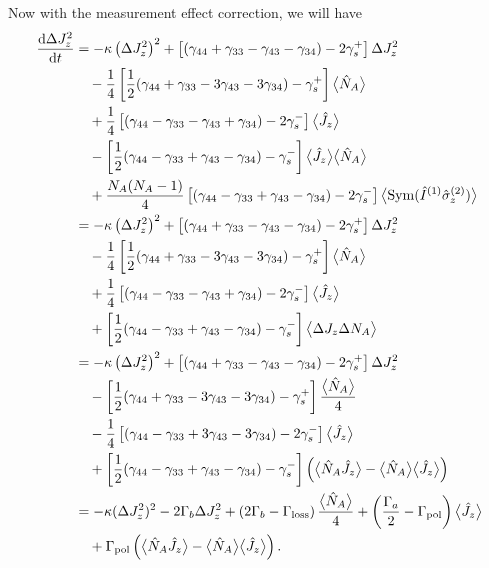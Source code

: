 Now with the measurement effect correction, we will have 
\begin{align}
\frac{{\mathrm d} {\Delta J_z^2}}{{\mathrm d}t} &= -\kappa \left(\Delta J_z^2 \right)^2 +\left[(\gamma_{44}+\gamma_{33}-\gamma_{43}-\gamma_{34} ) -2\gamma_s^+\right] \Delta J_z^2\nonumber\\
&\quad -\frac{1}{4}\left[\frac{1}{2}(\gamma_{44}+\gamma_{33}-3\gamma_{43}-3\gamma_{34} ) -\gamma_s^+\right] \big\langle \hat{N}_A  \big\rangle\nonumber\\
&\quad +\frac{1}{4}\left[(\gamma_{44}-\gamma_{33}-\gamma_{43}+\gamma_{34} ) -2\gamma_s^-\right] \big\langle \hat{J}_z  \big\rangle\nonumber\\
&\quad -\left[\frac{1}{2}(\gamma_{44}-\gamma_{33}+\gamma_{43}-\gamma_{34} ) -\gamma_s^-\right] \big\langle \hat{J}_z  \big\rangle\big\langle \hat{N}_A \big\rangle\nonumber\\
&\quad +\frac{N_A(N_A-1)}{4} \left[ (\gamma_{44}-\gamma_{33}+\gamma_{43}-\gamma_{34})  -2\gamma_s^-\right]\big\langle \mathrm{Sym}(\hat{I}^{(1)}\hat{\sigma}_z^{(2)} )  \big\rangle\\
&= -\kappa \left(\Delta J_z^2 \right)^2 +\left[(\gamma_{44}+\gamma_{33}-\gamma_{43}-\gamma_{34} ) -2\gamma_s^+\right] \Delta J_z^2\nonumber\\
&\quad -\frac{1}{4}\left[\frac{1}{2}(\gamma_{44}+\gamma_{33}-3\gamma_{43}-3\gamma_{34} ) -\gamma_s^+\right] \big\langle \hat{N}_A  \big\rangle\nonumber\\
&\quad +\frac{1}{4}\left[(\gamma_{44}-\gamma_{33}-\gamma_{43}+\gamma_{34} ) -2\gamma_s^-\right] \big\langle \hat{J}_z  \big\rangle\nonumber\\
&\quad +\left[\frac{1}{2}(\gamma_{44}-\gamma_{33}+\gamma_{43}-\gamma_{34} ) -\gamma_s^-\right] \big\langle \Delta J_z \Delta N_A \big\rangle\\
&=-\kappa \left(\Delta J_z^2 \right)^2 +\left[(\gamma_{44}+\gamma_{33}-\gamma_{43}-\gamma_{34} ) -2\gamma_s^+\right] \Delta J_z^2\nonumber\\
&\quad -\left[\frac{1}{2}(\gamma_{44}+\gamma_{33}-3\gamma_{43}-3\gamma_{34} ) -\gamma_s^+\right] \frac{\big\langle \hat{N}_A  \big\rangle}{4}\nonumber\\
&\quad -\frac{1}{4}\left[(\gamma_{44}-\gamma_{33}+3\gamma_{43}-3\gamma_{34} ) -2\gamma_s^-\right] \big\langle \hat{J}_z  \big\rangle\nonumber\\
&\quad +\left[\frac{1}{2}(\gamma_{44}-\gamma_{33}+\gamma_{43}-\gamma_{34} ) -\gamma_s^-\right] \left(\big\langle \hat{N}_A \hat{J}_z \big\rangle-\big\langle \hat{N}_A \big\rangle\big\langle \hat{J}_z \big\rangle\right)\\
&= -\kappa(\Delta J_z^2)^2 -2\Gamma_b\Delta J_z^2 + \left(2\Gamma_b-\Gamma_{\rm loss}\right)\frac{\big\langle \hat{N}_A \big\rangle}{4} +\left(\frac{\Gamma_a}{2}-\Gamma_{\rm pol} \right)\big\langle \hat{J}_z \big\rangle\nonumber\\
&\quad +\Gamma_{\rm pol}\left( \big\langle \hat{N}_A\hat{J}_z \big\rangle-\big\langle \hat{N}_A \big\rangle\big\langle \hat{J}_z \big\rangle \right) .
\end{align}
